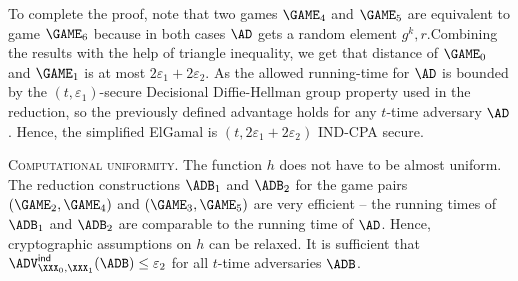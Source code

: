 \documentclass{crypto-exercise}
\renewcommand{\ADVIND}[2]{\ADV^{\mathsf{ind}}_{#1}(#2)}
\begin{document}
To complete the proof, note that two games $\GAME_4$ and $\GAME_5$ are equivalent to game $\GAME_6$ because in both cases $\AD$ gets a random element $g^k,r$.Combining the results with the help of triangle inequality, we get that distance of $\GAME_0$ and $\GAME_1$ is at most $2\varepsilon_1 + 2\varepsilon_2$. As the allowed running-time for $\AD$ is bounded by the $(t,\varepsilon_1)$-secure Decisional Diffie-Hellman group property used in the reduction, so the previously
defined advantage holds for any $t$-time adversary $\AD$. Hence, the
simplified ElGamal is $(t, 2\varepsilon_1 + 2\varepsilon_2)$ IND-CPA
secure.

\vspace*{2ex}
\noindent
\textsc{Computational uniformity.}
The function $h$ does not have to be almost uniform. The reduction constructions $\ADB_1$ and $\ADB_2$ for the game pairs  $(\GAME_2,\GAME_4)$ and $(\GAME_3,\GAME_5)$ are very efficient -- the running times of $\ADB_1$ and $\ADB_2$ are comparable to the running time of $\AD$. Hence, cryptographic assumptions on $h$ can be relaxed. It is sufficient that
$\ADVIND{\XXX_0,\XXX_1}{\ADB}\leq \varepsilon_2$ for all $t$-time adversaries $\ADB$. 
\end{document}
